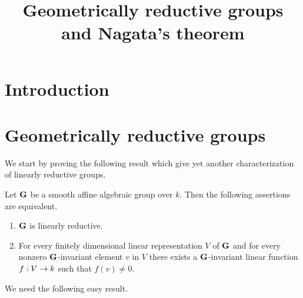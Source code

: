 



\title{Geometrically reductive groups and Nagata's theorem}
\date{}
\maketitle

\section{Introduction}
\noindent


\section{Geometrically reductive groups}
\noindent
We start by proving the following result which give yet another characterization of linearly reductive groups.

\begin{theorem}\label{theorem:characterization_of_linearly_reductive_groups_in_terms_of_existence_of_invariant_linear_forms}
Let $\mathbf{G}$ be a smooth affine algebraic group over $k$. Then the following assertions are equivalent.
\begin{enumerate}[label=\emph{\textbf{(\roman*)}}, leftmargin=3.0em]
\item $\mathbf{G}$ is linearly reductive.
\item For every finitely dimensional linear representation $V$ of $\mathbf{G}$ and for every nonzero $\mathbf{G}$-invariant element $v$ in $V$ there exists a $\mathbf{G}$-invariant linear function $f:V\rightarrow k$ such that $f(v)\neq 0$. 
\end{enumerate}
\end{theorem}
\noindent
We need the following easy result.

